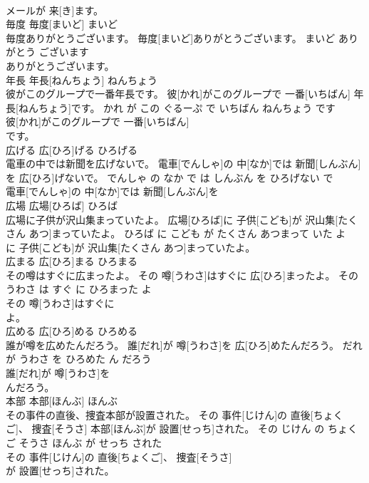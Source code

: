 \documentclass[8pt]{extreport}
\begin{document}
\begin{CJK}{UTF8}{min}
\\	メールが 来[き]ます。			
\\	毎度	毎度[まいど]	まいど	
\\	毎度ありがとうございます。	毎度[まいど]ありがとうございます。	まいど ありがとう ございます	
\\	ありがとうございます。			
\\	年長	年長[ねんちょう]	ねんちょう	
\\	彼がこのグループで一番年長です。	彼[かれ]がこのグループで 一番[いちばん] 年長[ねんちょう]です。	かれ が この ぐるーぷ で いちばん ねんちょう です	
\\	彼[かれ]がこのグループで 一番[いちばん]
\\	です。			
\\	広げる	広[ひろ]げる	ひろげる	
\\	電車の中では新聞を広げないで。	電車[でんしゃ]の 中[なか]では 新聞[しんぶん]を 広[ひろ]げないで。	でんしゃ の なか で は しんぶん を ひろげない で	
\\	電車[でんしゃ]の 中[なか]では 新聞[しんぶん]を
\\	広場	広場[ひろば]	ひろば	
\\	広場に子供が沢山集まっていたよ。	広場[ひろば]に 子供[こども]が 沢山集[たくさん あつ]まっていたよ。	ひろば に こども が たくさん あつまって いた よ	
\\	に 子供[こども]が 沢山集[たくさん あつ]まっていたよ。			
\\	広まる	広[ひろ]まる	ひろまる	
\\	その噂はすぐに広まったよ。	その 噂[うわさ]はすぐに 広[ひろ]まったよ。	その うわさ は すぐ に ひろまった よ	
\\	その 噂[うわさ]はすぐに
\\	よ。			
\\	広める	広[ひろ]める	ひろめる	
\\	誰が噂を広めたんだろう。	誰[だれ]が 噂[うわさ]を 広[ひろ]めたんだろう。	だれ が うわさ を ひろめた ん だろう	
\\	誰[だれ]が 噂[うわさ]を
\\	んだろう。			
\\	本部	本部[ほんぶ]	ほんぶ	
\\	その事件の直後、捜査本部が設置された。	その 事件[じけん]の 直後[ちょくご]、 捜査[そうさ] 本部[ほんぶ]が 設置[せっち]された。	その じけん の ちょくご そうさ ほんぶ が せっち された	
\\	その 事件[じけん]の 直後[ちょくご]、 捜査[そうさ]
\\	が 設置[せっち]された。			

\end{CJK}
\end{document}
